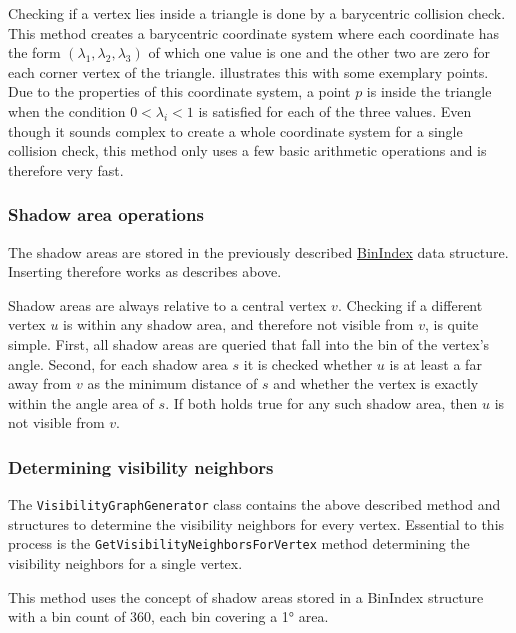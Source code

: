 				\noindent Checking if a vertex lies inside a triangle is done by a barycentric collision check.
				This method creates a barycentric coordinate system where each coordinate has the form $(\lambda_1,\lambda_2,\lambda_3)$ of which one value is one and the other two are zero for each corner vertex of the triangle.
				 illustrates this with some exemplary points.
				Due to the properties of this coordinate system, a point $p$ is inside the triangle when the condition $0 < \lambda_i < 1$ is satisfied for each of the three values.
				Even though it sounds complex to create a whole coordinate system for a single collision check, this method only uses a few basic arithmetic operations and is therefore very fast.
				
			\subsubsection{Shadow area operations}
				
				The shadow areas are stored in the previously described \hyperref[subsec:binindex]{BinIndex} data structure.
				Inserting therefore works as describes above.
				
				Shadow areas are always relative to a central vertex $v$.
				Checking if a different vertex $u$ is within any shadow area, and therefore not visible from $v$, is quite simple.
				First, all shadow areas are queried that fall into the bin of the vertex's angle.
				Second, for each shadow area $s$ it is checked whether $u$ is at least a far away from $v$ as the minimum distance of $s$ and whether the vertex is exactly within the angle area of $s$.
				If both holds true for any such shadow area, then $u$ is not visible from $v$.
				
			\subsubsection{Determining visibility neighbors}
			
				The \texttt{VisibilityGraphGenerator} class contains the above described method and structures to determine the visibility neighbors for every vertex.
				Essential to this process is the \texttt{GetVisibilityNeighborsForVertex} method determining the visibility neighbors for a single vertex.
				
				This method uses the concept of shadow areas stored in a BinIndex structure with a bin count of 360, each bin covering a 1° area.
				
